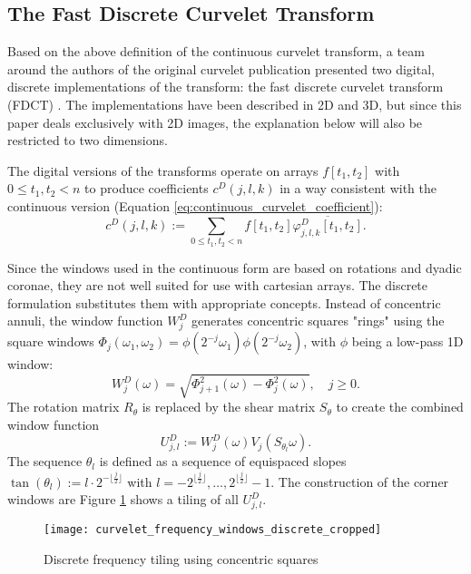 \subsection{The Fast Discrete Curvelet Transform}

Based on the above definition of the continuous curvelet transform, a team
around the authors of the original curvelet publication presented two digital,
discrete implementations of the transform: the fast discrete curvelet transform
(FDCT) \autocite{candes_fast_2006}. The implementations have been described in
2D and 3D, but since this paper deals exclusively with 2D images, the
explanation below will also be restricted to two dimensions.

The digital versions of the transforms operate on arrays $f[t_1, t_2]$ with $0
\leq t_1, t_2 < n$ to produce coefficients $c^D(j, l, k)$ in a way
consistent with the continuous version (Equation
\ref{eq:continuous_curvelet_coefficient}):
\begin{equation}
    c^D(j, l, k) := \sum_{0 \leq t_1, t_2 < n} f[t_1, t_2] \overline{\varphi_{j, l, k}^D[t_1, t_2]}.
\end{equation}

Since the windows used in the continuous form are based on rotations and dyadic
coronae, they are not well suited for use with cartesian arrays. The discrete
formulation substitutes them with appropriate concepts. Instead of concentric
annuli, the window function $W^D_j$ generates concentric squares "rings" using
the square windows $\Phi_j(\omega_1, \omega_2) = \phi(2^{-j}\omega_1)
\phi(2^{-j}\omega_2)$, with $\phi$ being a low-pass 1D window:
\begin{equation*}
    W_j^D(\omega) = \sqrt{\Phi_{j+1}^2(\omega) - \Phi_j^2(\omega)}, \quad j \geq 0.
\end{equation*}
The rotation matrix $R_{\theta}$ is replaced by the shear matrix $S_{\theta}$
to create the combined window function
\begin{equation*}
    U_{j, l}^D := W_j^D(\omega) V_j(S_{\theta_l}\omega).
\end{equation*}
The sequence $\theta_l$ is defined as a sequence of equispaced slopes
$\tan(\theta_l) := l \cdot 2^{- \lfloor \frac{j}{2} \rfloor}$ with
$l=-2^{\lfloor \frac{j}{2} \rfloor}, \dots, 2^{\lfloor \frac{j}{2} \rfloor} -
1$. The construction of the corner windows are  Figure \ref{fig:curvelet_frequency_windows_discrete} shows a tiling of
all $U_{j, l}^D$.

\begin{figure}[h]
    \centering
        \texttt{[image: curvelet\_frequency\_windows\_discrete\_cropped]}
    \caption{Discrete frequency tiling using concentric squares}
    \label{fig:curvelet_frequency_windows_discrete}
\end{figure}

